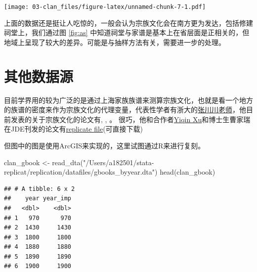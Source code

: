\documentclass[
  oneside]{book}
\newenvironment{Shaded}{\begin{snugshade}}{\end{snugshade}}
\newcommand{\FunctionTok}[1]{\textcolor[rgb]{0.00,0.00,0.00}{#1}}
\newcommand{\NormalTok}[1]{#1}
\newcommand{\OtherTok}[1]{\textcolor[rgb]{0.56,0.35,0.01}{#1}}
\newcommand{\StringTok}[1]{\textcolor[rgb]{0.31,0.60,0.02}{#1}}
\begin{document}
\texttt{[image: 03-clan\_files/figure-latex/unnamed-chunk-7-1.pdf]}

上面的数据还是挺让人吃惊的，一般会认为宗族文化会在南方更为发达，包括修建祠堂上，我们通过图 \ref{fig:as} 中知道祠堂与家谱是基本上在省层面是正相关的，但地域上呈现了较大的差异。可能是与抽样方法有关，需要进一步的处理。

\hypertarget{ux5176ux4ed6ux6570ux636eux6e90}{%
\section{其他数据源}\label{ux5176ux4ed6ux6570ux636eux6e90}}

目前学界用的较为广泛的是通过上海家族族谱来测算宗族文化，也就是看一个地方的族谱的密度来作为宗族文化的代理变量，代表性学者有浙大的\href{https://scholar.google.com/citations?user=_YWE1C4AAAAJ\&hl=en\&oi=ao}{张川川老师}，他目前发表的关于宗族文化的论文有\autocite{Cao2022}, \autocite{ZHANG2020100}, \autocite{ZhangKawagawa2017}。
很巧，他和合作者\href{https://yiqingxu.org/}{Yiqin Xu}和博士生曹家瑞在JDE刊发的论文有\href{https://yiqingxu.org/papers/english/2022_famine/replication.zip}{replicate file}(可直接下载)

但图中的图是使用ArcGIS来实现的，这里试图通过R来进行复刻。

\begin{Shaded}
\begin{Highlighting}[]
\NormalTok{clan\_gbook }\OtherTok{\textless{}{-}} \FunctionTok{read\_dta}\NormalTok{(}\StringTok{"/Users/a182501/stata{-}replicat/replication/datafiles/gbooks\_byyear.dta"}\NormalTok{)}
\FunctionTok{head}\NormalTok{(clan\_gbook)}
\end{Highlighting}
\end{Shaded}

\begin{verbatim}
## # A tibble: 6 x 2
##    year year_imp
##   <dbl>    <dbl>
## 1   970      970
## 2  1430     1430
## 3  1800     1800
## 4  1880     1880
## 5  1890     1890
## 6  1900     1900
\end{verbatim}
\end{document}
